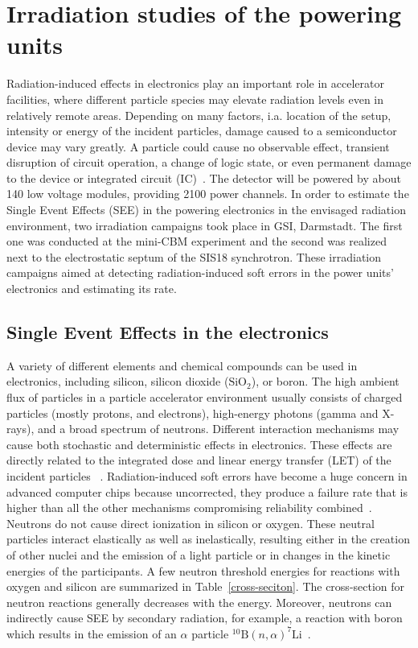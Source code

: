 \section{Irradiation studies of the powering units}
Radiation-induced effects in electronics play an important role in accelerator facilities, where different particle species may elevate radiation levels even in relatively remote areas. Depending on many factors, i.a. location of the setup, intensity or energy of the incident particles, damage caused to a semiconductor device may vary greatly. A particle could cause no observable effect, transient disruption of circuit operation, a change of logic state, or even permanent damage to the device or integrated circuit (IC)~\cite{dodd}. The detector will be powered by about 140 low voltage modules, providing 2100 power channels. In order to estimate the Single Event Effects (SEE) in the powering electronics in the envisaged radiation environment, two irradiation campaigns took place in GSI, Darmstadt.  The first one was conducted at the mini-CBM experiment and the second was realized next to the electrostatic septum of the SIS18 synchrotron. These irradiation campaigns aimed at detecting radiation-induced soft errors in the power units' electronics and estimating its rate.


\subsection{Single Event Effects in the electronics}
A variety of different elements and chemical compounds can be used in electronics, including silicon, silicon dioxide ($\mathrm{SiO}_{2}$), or boron. The high ambient flux of particles in a particle accelerator environment usually consists of charged particles (mostly protons, and electrons), high-energy photons (gamma and X-rays), and a broad spectrum of neutrons. Different interaction mechanisms may cause both stochastic and deterministic effects in electronics. These effects are directly related to the integrated dose and linear energy transfer (\gls{LET}) of the incident particles ~\cite{electronic_system_on_module}. Radiation-induced soft errors have become a huge concern in advanced computer chips because uncorrected, they produce a failure rate that is higher than all the other mechanisms compromising reliability combined~\cite{1545891}. Neutrons do not cause direct ionization in silicon or oxygen. These neutral particles interact elastically as well as inelastically, resulting either in the creation of other nuclei and the emission of a light particle or in changes in the kinetic energies of the participants. A few neutron threshold energies for reactions with oxygen and silicon are summarized in Table~\ref{cross-seciton}. The cross-section for neutron reactions generally decreases with the energy. Moreover, neutrons can indirectly cause SEE by secondary radiation, for example, a reaction with boron which results in the emission of an $\alpha$ particle $^{10}\mathrm{B}(n,\alpha)^{7}\mathrm{Li}$~\cite{1545891,neutrons_energy,neutrons_energy_2}. 

